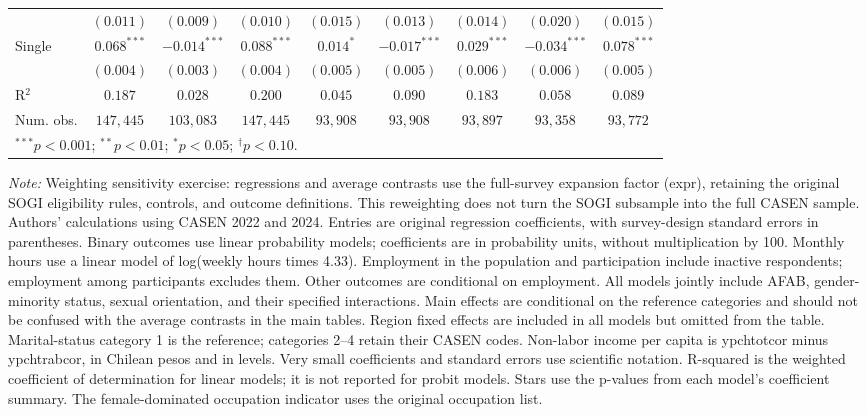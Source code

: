 \begin{table}[htpb]
{\begin{tabular}{l c c c c c c c c}
 & $(0.011)$ & $(0.009)$ & $(0.010)$ & $(0.015)$ & $(0.013)$ & $(0.014)$ & $(0.020)$ & $(0.015)$ \\
Single & $0.068^{***}$ & $-0.014^{***}$ & $0.088^{***}$ & $0.014^{*}$ & $-0.017^{***}$ & $0.029^{***}$ & $-0.034^{***}$ & $0.078^{***}$ \\
 & $(0.004)$ & $(0.003)$ & $(0.004)$ & $(0.005)$ & $(0.005)$ & $(0.006)$ & $(0.006)$ & $(0.005)$ \\
\hline
R$^2$ & $0.187$ & $0.028$ & $0.200$ & $0.045$ & $0.090$ & $0.183$ & $0.058$ & $0.089$ \\
Num. obs. & $147,445$ & $103,083$ & $147,445$ & $93,908$ & $93,908$ & $93,897$ & $93,358$ & $93,772$ \\
\hline
\multicolumn{9}{l}{\scriptsize $^{***}p<0.001$; $^{**}p<0.01$; $^{*}p<0.05$; $^{\dagger}p<0.10$.} \\
\end{tabular}%
}
\par\smallskip
\begin{minipage}{\textwidth}\footnotesize\raggedright
\textit{Note:} Weighting sensitivity exercise: regressions and average contrasts use the full-survey expansion factor (expr), retaining the original SOGI eligibility rules, controls, and outcome definitions. This reweighting does not turn the SOGI subsample into the full CASEN sample. Authors' calculations using CASEN 2022 and 2024. Entries are original regression coefficients, with survey-design standard errors in parentheses. Binary outcomes use linear probability models; coefficients are in probability units, without multiplication by 100. Monthly hours use a linear model of log(weekly hours times 4.33). Employment in the population and participation include inactive respondents; employment among participants excludes them. Other outcomes are conditional on employment. All models jointly include AFAB, gender-minority status, sexual orientation, and their specified interactions. Main effects are conditional on the reference categories and should not be confused with the average contrasts in the main tables. Region fixed effects are included in all models but omitted from the table. Marital-status category 1 is the reference; categories 2--4 retain their CASEN codes. Non-labor income per capita is ypchtotcor minus ypchtrabcor, in Chilean pesos and in levels. Very small coefficients and standard errors use scientific notation. R-squared is the weighted coefficient of determination for linear models; it is not reported for probit models. Stars use the p-values from each model's coefficient summary. The female-dominated occupation indicator uses the original occupation list.
\end{minipage}
\end{table}
